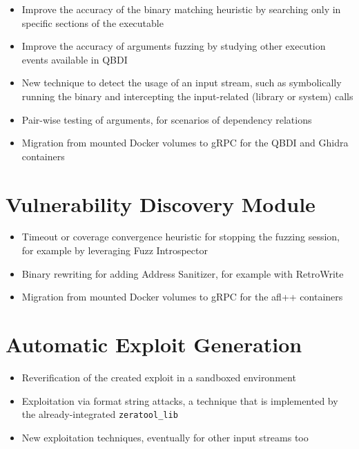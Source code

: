 \documentclass[../main.tex]{subfiles}
\begin{document}
\begin{itemize}
\tightlist
\item
  Improve the accuracy of the binary matching heuristic by searching
  only in specific sections of the executable
\item
  Improve the accuracy of arguments fuzzing by studying other execution
  events available in QBDI
\item
  New technique to detect the usage of an input stream, such as
  symbolically running the binary and intercepting the input-related
  (library or system) calls
\item
  Pair-wise testing of arguments, for scenarios of dependency relations
\item
  Migration from mounted Docker volumes to gRPC for the QBDI and Ghidra
  containers
\end{itemize}

\hypertarget{vulnerability-discovery-module}{%
\section{Vulnerability Discovery
Module}\label{vulnerability-discovery-module}}

\begin{itemize}
\tightlist
\item
  Timeout or coverage convergence heuristic for stopping the fuzzing
  session, for example by leveraging Fuzz Introspector
\item
  Binary rewriting for adding Address Sanitizer, for example with
  RetroWrite
\item
  Migration from mounted Docker volumes to gRPC for the afl++ containers
\end{itemize}

\hypertarget{automatic-exploit-generation}{%
\section{Automatic Exploit
Generation}\label{automatic-exploit-generation}}

\begin{itemize}
\tightlist
\item
  Reverification of the created exploit in a sandboxed environment
\item
  Exploitation via format string attacks, a technique that is
  implemented by the already-integrated \texttt{zeratool\_lib}
\item
  New exploitation techniques, eventually for other input streams too
\end{itemize}
\end{document}
